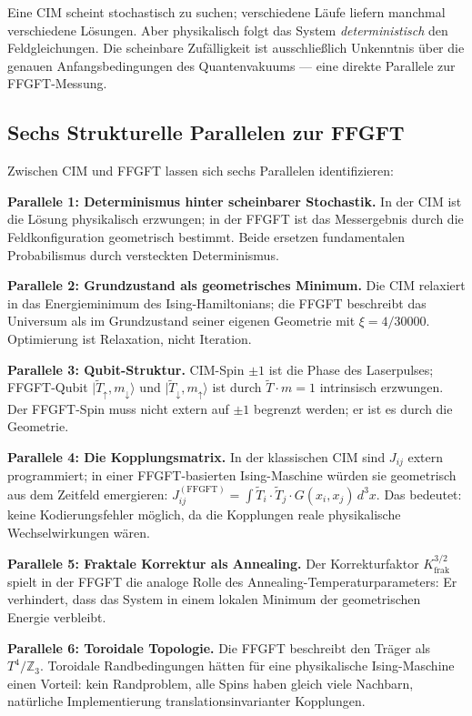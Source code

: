 Eine CIM scheint stochastisch zu suchen; verschiedene Läufe liefern
manchmal verschiedene Lösungen. Aber physikalisch folgt das System
\emph{deterministisch} den Feldgleichungen. Die scheinbare Zufälligkeit
ist ausschließlich Unkenntnis über die genauen Anfangsbedingungen des
Quantenvakuums --- eine direkte Parallele zur FFGFT-Messung.

\subsection*{Sechs Strukturelle Parallelen zur FFGFT}

Zwischen CIM und FFGFT lassen sich sechs Parallelen identifizieren:

\textbf{Parallele 1: Determinismus hinter scheinbarer Stochastik.} In
der CIM ist die Lösung physikalisch erzwungen; in der FFGFT ist das
Messergebnis durch die Feldkonfiguration geometrisch bestimmt. Beide
ersetzen fundamentalen Probabilismus durch versteckten Determinismus.

\textbf{Parallele 2: Grundzustand als geometrisches Minimum.} Die CIM
relaxiert in das Energieminimum des Ising-Hamiltonians; die FFGFT
beschreibt das Universum als im Grundzustand seiner eigenen Geometrie
mit $\xi = 4/30000$. Optimierung ist Relaxation, nicht Iteration.

\textbf{Parallele 3: Qubit-Struktur.} CIM-Spin $\pm1$ ist die Phase
des Laserpulses; FFGFT-Qubit $|\tilde T_\uparrow,m_\downarrow\rangle$
und $|\tilde T_\downarrow,m_\uparrow\rangle$ ist durch $\tilde T\cdot m = 1$
intrinsisch erzwungen. Der FFGFT-Spin muss nicht extern auf $\pm1$
begrenzt werden; er ist es durch die Geometrie.

\textbf{Parallele 4: Die Kopplungsmatrix.} In der klassischen CIM sind
$J_{ij}$ extern programmiert; in einer FFGFT-basierten Ising-Maschine
würden sie geometrisch aus dem Zeitfeld emergieren:
$J_{ij}^{(\mathrm{FFGFT})} = \int\tilde T_i\cdot\tilde T_j\cdot G(x_i,x_j)\,d^3x$.
Das bedeutet: keine Kodierungsfehler möglich, da die Kopplungen reale
physikalische Wechselwirkungen wären.

\textbf{Parallele 5: Fraktale Korrektur als Annealing.} Der Korrekturfaktor
$K_{\mathrm{frak}}^{3/2}$ spielt in der FFGFT die analoge Rolle des
Annealing-Temperaturparameters: Er verhindert, dass das System in einem
lokalen Minimum der geometrischen Energie verbleibt.

\textbf{Parallele 6: Toroidale Topologie.} Die FFGFT beschreibt den
Träger als $T^4/\mathbb{Z}_3$. Toroidale Randbedingungen hätten für
eine physikalische Ising-Maschine einen Vorteil: kein Randproblem, alle
Spins haben gleich viele Nachbarn, natürliche Implementierung
translationsinvarianter Kopplungen.

